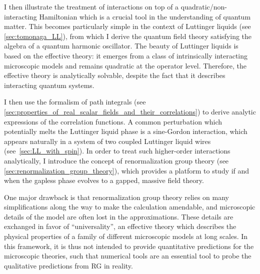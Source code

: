 I then illustrate the treatment of interactions on top of a quadratic/non-interacting Hamiltonian which is a crucial tool in the understanding of quantum matter.
This becomes particularly simple in the context of Luttinger liquids (see \cref{sec:tomonaga_LL}), from which I derive the quantum field theory satisfying the algebra of a quantum harmonic oscillator.
The beauty of Luttinger liquids is based on the effective theory: it emerges from a class of intrinsically interacting microscopic models and remains quadratic at the operator level.
Therefore, the effective theory is analytically solvable, despite the fact that it describes interacting quantum systems.

I then use the formalism of path integrals (see \cref{sec:properties_of_real_scalar_fields_and_their_correlations}) to derive analytic expressions of the correlation functions.
A common perturbation which potentially melts the Luttinger liquid phase is a sine-Gordon interaction, which appears naturally in a system of two coupled Luttinger liquid wires (see~\cref{sec:LL_with_spin}).
In order to treat such higher-order interactions analytically, I introduce the concept of renormalization group theory (see \cref{sec:renormalization_group_theory}), which provides a platform to study if and when the gapless phase evolves to a gapped, massive field theory.

One major drawback is that renormalization group theory relies on many simplifications along the way to make the calculation amendable, and microscopic details of the model are often lost in the approximations.
These details are exchanged in favor of ``universality'', an effective theory which describes the physical properties of a family of different microscopic models at long scales.
In this framework, it is thus not intended to provide quantitative predictions for the microscopic theories, such that numerical tools are an essential tool to probe the qualitative predictions from RG in reality.

